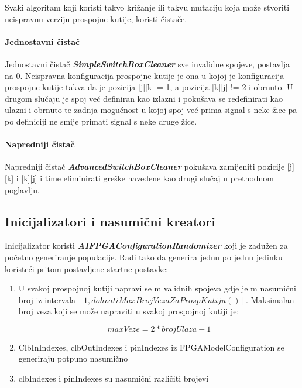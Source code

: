 \documentclass[times, utf8, zavrsni]{fer}
\begin{document}
	Svaki algoritam koji koristi takvo križanje ili takvu mutaciju koja može stvoriti neispravnu verziju prospojne kutije, koristi čistače. 
	
	\paragraph{Jednostavni čistač}
	
	Jednostavni čistač \textbf{\emph{SimpleSwitchBoxCleaner}} sve invalidne spojeve, postavlja na 0. Neispravna konfiguracija prospojne kutije je ona u kojoj je konfiguracija prospojne kutije takva da je pozicija [j][k] = 1, a pozicija [k][j] != 2 i obrnuto. U drugom slučaju je spoj već definiran kao izlazni i pokušava se redefinirati kao ulazni i obrnuto te zadnja mogućnost u kojoj spoj već prima signal s neke žice pa po definiciji ne smije primati signal s neke druge žice. 
	
	\paragraph{Napredniji čistač}
	
	Napredniji čistač \textbf{\emph{AdvancedSwitchBoxCleaner}} pokušava zamijeniti pozicije [j][k] i [k][j] i time eliminirati greške navedene kao drugi slučaj u prethodnom poglavlju.
	
	\subsection{Inicijalizatori i nasumični kreatori}
	
	Inicijalizator koristi \textbf{\emph{AIFPGAConfigurationRandomizer}} koji je zadužen za početno generiranje populacije. Radi tako da generira jednu po jednu jedinku koristeći pritom postavljene startne postavke:
	
	\begin{enumerate}
		\item U svakoj prospojnoj kutiji napravi se m validnih spojeva gdje je m nasumični broj iz intervala $[1, dohvatiMaxBrojVezaZaProspKutiju()]$. Maksimalan broj veza koji se može napraviti u svakoj prospojnoj kutiji je:
		
		\begin{equation}
			maxVeze=2\ast brojUlaza -1
		\end{equation}
		
		\item ClbInIndexes, clbOutIndexes i pinIndexes iz FPGAModelConfiguration se generiraju potpuno nasumično
		\item clbIndexes i pinIndexes su nasumični različiti brojevi
	\end{enumerate}
	
\end{document}
